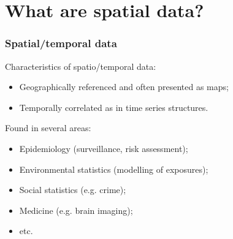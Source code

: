 \documentclass[slidestop,compress,serif,10pt]{beamer}
\begin{document}
\section{What are spatial data?}
\begin{frame}\frametitle{Spatial/temporal data}\vfill

Characteristics of spatio/temporal data:
\begin{itemize}
\item Geographically referenced and often presented as maps;
\item Temporally correlated as in time series structures.
\end{itemize}

Found in several areas:
\begin{itemize}
\item Epidemiology (surveillance, risk assessment);
\item Environmental statistics (modelling of exposures);
\item Social statistics (e.g. crime);
\item Medicine (e.g. brain imaging);
\item etc.
\end{itemize}
\end{frame}
\end{document}
